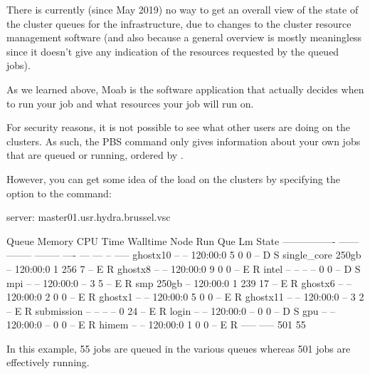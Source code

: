 \ifgent

There is currently (since May 2019) no way to get an overall view of the state of the cluster queues
for the \hpcInfra infrastructure, due to changes to the cluster resource management software
(and also because a general overview is mostly meaningless since it doesn't give any indication of
the resources requested by the queued jobs).

\else  %

As we learned above, Moab is the software application that actually decides
when to run your job and what resources your job will run on.

\ifbrussel
  For security reasons, it is not possible to see what other users are doing on
  the clusters. As such, the PBS  command only gives information
  about your own jobs that are queued or running, ordered by .

  However, you can get some idea of the load on the clusters by specifying
  the  option to the  command:

\begin{prompt}
server: master01.usr.hydra.brussel.vsc

Queue            Memory CPU Time Walltime Node  Run Que Lm  State
---------------- ------ -------- -------- ----  --- --- --  -----
ghostx10           --      --    120:00:0     5   0   0 --   D S
single_core       250gb    --    120:00:0     1 256   7 --   E R
ghostx8            --      --    120:00:0     9   0   0 --   E R
intel              --      --       --      --    0   0 --   D S
mpi                --      --    120:00:0   --    3   5 --   E R
smp               250gb    --    120:00:0     1 239  17 --   E R
ghostx6            --      --    120:00:0     2   0   0 --   E R
ghostx1            --      --    120:00:0     5   0   0 --   E R
ghostx11           --      --    120:00:0   --    3   2 --   E R
submission         --      --       --      --    0  24 --   E R
login              --      --    120:00:0   --    0   0 --   D S
gpu                --      --    120:00:0   --    0   0 --   E R
himem              --      --    120:00:0     1   0   0 --   E R
                                               ----- -----
                                                 501    55
\end{prompt}

  In this example, 55 jobs are queued in the various queues whereas 501 jobs
  are effectively running.

